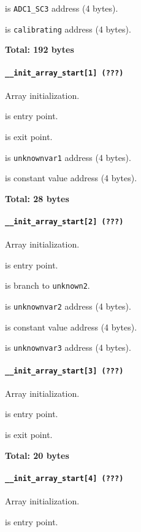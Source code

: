  is \texttt{ADC1\_SC3} address (4 bytes).

 is \texttt{calibrating} address (4 bytes).

\textbf{Total: 192 bytes}

\paragraph{\texttt{\_\_init\_array\_start[1] (???)}} Array initialization.

 is entry point.

 is exit point.

 is \texttt{unknownvar1} address (4 bytes).

 is constant value address (4 bytes).

\textbf{Total: 28 bytes}

\paragraph{\texttt{\_\_init\_array\_start[2] (???)}} Array initialization.

 is entry point.

 is branch to \texttt{unknown2}.

 is \texttt{unknownvar2} address (4 bytes).

 is constant value address (4 bytes).

 is \texttt{unknownvar3} address (4 bytes).

\paragraph{\texttt{\_\_init\_array\_start[3] (???)}} Array initialization.

 is entry point.

 is exit point.

\textbf{Total: 20 bytes}

\paragraph{\texttt{\_\_init\_array\_start[4] (???)}} Array initialization.

 is entry point.

